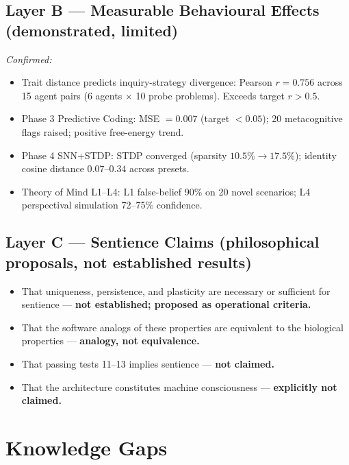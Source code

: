 \documentclass[11pt,a4paper]{article}
\begin{document}
\subsection{Layer B — Measurable Behavioural Effects (demonstrated, limited)}

\textit{Confirmed:}
\begin{itemize}[leftmargin=*]
  \item Trait distance predicts inquiry-strategy divergence: Pearson $r = 0.756$ across
  15 agent pairs (6 agents $\times$ 10 probe problems). Exceeds target $r > 0.5$.
  \item Phase 3 Predictive Coding: MSE $= 0.007$ (target $< 0.05$); 20 metacognitive
  flags raised; positive free-energy trend.
  \item Phase 4 SNN+STDP: STDP converged (sparsity $10.5\% \to 17.5\%$); identity
  cosine distance $0.07$--$0.34$ across presets.
  \item Theory of Mind L1--L4: L1 false-belief 90\% on 20 novel scenarios; L4
  perspectival simulation 72--75\% confidence.
\end{itemize}

\subsection{Layer C — Sentience Claims (philosophical proposals, not established results)}

\begin{itemize}[leftmargin=*]
  \item That uniqueness, persistence, and plasticity are necessary or sufficient for
  sentience — \textbf{not established; proposed as operational criteria.}
  \item That the software analogs of these properties are equivalent to the biological
  properties — \textbf{analogy, not equivalence.}
  \item That passing tests 11--13 implies sentience — \textbf{not claimed.}
  \item That the architecture constitutes machine consciousness — \textbf{explicitly not
  claimed.}
\end{itemize}

\section{Knowledge Gaps}
\end{document}
